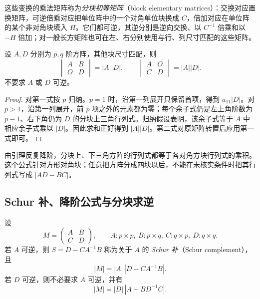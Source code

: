 这些变换的乘法矩阵称为\emph{分块初等矩阵}（block elementary matrices）：交换对应置换矩阵，可逆倍乘对应把单位阵中的一个对角单位块换成 $C$，倍加对应在单位阵的某个非对角块填入 $H$。它们都可逆，其逆分别是逆向交换、以 $C^{-1}$ 倍乘和以 $-H$ 倍加；对一般长方矩阵也可在左、右分别使用与行、列尺寸匹配的这些矩阵。

\begin{lemma}[分块三角行列式]
\label{lem:matrix-block-triangular-determinant}
设 $A,D$ 分别为 $p,q$ 阶方阵，其他块尺寸匹配，则
\begin{equation}
\label{eq:matrix-block-triangular-determinant}
    \begin{vmatrix}A&B\\O&D\end{vmatrix}=|A||D|,
    \qquad
    \begin{vmatrix}A&O\\C&D\end{vmatrix}=|A||D|.
\end{equation}
不要求 $A$ 或 $D$ 可逆。
\end{lemma}

\begin{proof}
对第一式按 $p$ 归纳。$p=1$ 时，沿第一列展开只保留首项，得到 $a_{11}|D|$。对 $p>1$，沿第一列展开，前 $p$ 项之外的元素都为零；每个余子式仍是左上角阶数为 $p-1$、右下角仍为 $D$ 的分块上三角行列式。归纳假设表明，该余子式等于 $A$ 中相应余子式乘以 $|D|$。因此求和正好得到 $|A||D|$。第二式对原矩阵转置后应用第一式即可。
\end{proof}

由引理反复降阶，分块上、下三角方阵的行列式都等于各对角方块行列式的乘积。这个公式针对方形对角块；任意把方阵分成四块以后，不能在未核实条件时把其行列式写成 $|AD-BC|$。

\subsection{Schur 补、降阶公式与分块求逆}

\begin{theorem}[分块行列式的消元公式]
\label{thm:matrix-schur-determinant}
设
\[
    M=\begin{pmatrix}A&B\\C&D\end{pmatrix},
    \qquad A:p\times p,\ B:p\times q,\ C:q\times p,\ D:q\times q.
\]
若 $A$ 可逆，则 $S=D-CA^{-1}B$ 称为关于 $A$ 的 \emph{Schur 补}（Schur complement），且
\begin{equation}
\label{eq:matrix-schur-complement-A}
    |M|=|A|\,|D-CA^{-1}B|.
\end{equation}
若 $D$ 可逆，则不必要求 $A$ 可逆，并有
\begin{equation}
\label{eq:matrix-schur-complement-D}
    |M|=|D|\,|A-BD^{-1}C|.
\end{equation}
\end{theorem}

